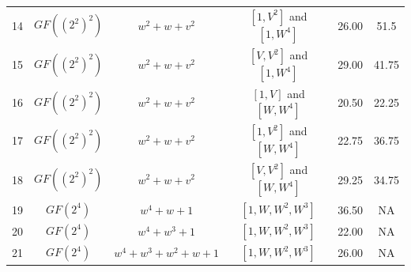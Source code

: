 \begin{table}
\begin{center}
\begin{tabular}{| c | c | c | c | c | c | }
	14 & $GF((2^2)^2)$ & $w^2 + w + v^2$ & $[1, V^2]$ and $[1, W^4]$   & 26.00 & 51.5      \\
	15 & $GF((2^2)^2)$ & $w^2 + w + v^2$ & $[V, V^2]$ and $[1, W^4]$   & 29.00 & 41.75     \\
	16 & $GF((2^2)^2)$ & $w^2 + w + v^2$ & $[1, V]$ and $[W, W^4]$     & 20.50 & 22.25     \\
	17 & $GF((2^2)^2)$ & $w^2 + w + v^2$ & $[1, V^2]$ and $[W, W^4]$   & 22.75 & 36.75     \\
	18 & $GF((2^2)^2)$ & $w^2 + w + v^2$ & $[V, V^2]$ and $[W, W^4]$   & 29.25 & 34.75     \\
	19 & $GF(2^4)$ & $w^4 + w + 1$ & $[1, W, W^2, W^3]$                & 36.50 & NA  \\
	20 & $GF(2^4)$ & $w^4 + w^3 + 1$  & $[1, W, W^2, W^3]$             & 22.00 & NA  \\
	21 & $GF(2^4)$ & $w^4 + w^3 + w^2 + w + 1$  & $[1, W, W^2, W^3]$   & 26.00 & NA  \\ \hline
	
	\end{tabular}
\end{center}
\end{table}
